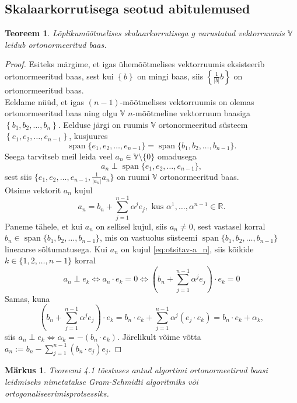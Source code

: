 \documentclass[a4paper,12pt]{article}
\newtheorem{teoreem}{Teoreem}[section]
\newtheorem{markus}{Märkus}[section]
\numberwithin{equation}{section}
\DeclareMathOperator{\spn}{span}
\begin{document}
\newpage
\begin{appendices}
\section{Skalaarkorrutisega seotud abitulemused}
\label{lisa:skalaar}

\begin{teoreem}
Lõplikumõõtmelises skalaarkorrutisega $g$ varustatud vektorruumis $\mathbb{V}$ leidub ortonormeeritud baas.
\end{teoreem}
\begin{proof}
Esiteks märgime, et igas ühemõõtmelises vektorruumis eksisteerib ortonormeeritud baas, sest kui $\left\lbrace b \right\rbrace$ on mingi baas, siis $\left\lbrace \frac{1}{|b|} b\right\rbrace$ on ortonormeeritud baas.\\
Eeldame nüüd, et igas $(n-1)$-mõõtmelises vektorruumis on olemas ortonormeeritud baas ning olgu $\mathbb{V}$ $n$-mõõtmeline vektorruum baasiga $\left\lbrace b_1, b_2, \dots, b_n \right\rbrace$. Eelduse järgi on ruumis $\mathbb{V}$ ortonormeeritud süsteem $\left\lbrace e_1, e_2, \dots, e_{n-1} \right\rbrace$, kusjuures
\[ \spn\{ e_1, e_2, \dots, e_{n-1}\} = \spn\{ b_1, b_2, \dots, b_{n-1}\}. \]
Seega tarvitseb meil leida veel $a_n \in \mathbb{V} \setminus \{0\}$ omadusega
\[a_n \perp \spn\{ e_1, e_2, \dots, e_{n-1}\},\]
sest siis $\{ e_1, e_2, \dots, e_{n-1}, \frac{1}{|a_n|}a_n\}$ on ruumi $\mathbb{V}$ ortonormeeritud baas.\\
Otsime vektorit $a_n$ kujul
\begin{equation} \label{eq:otsitav-a_n}
a_n = b_n + \sum_{j = 1}^{n-1} \alpha^j e_j, \text{ kus } \alpha^1, \dots, \alpha^{n-1} \in \mathbb{R}.
\end{equation}
Paneme tähele, et kui $a_n$ on sellisel kujul, siis $a_n \neq 0$, sest vastasel korral $b_n \in \spn\{ b_1, b_2, \dots, b_{n-1}\}$, mis on vastuolus süsteemi $\spn\{ b_1, b_2, \dots, b_{n-1}\}$ lineaarse sõltumatusega.
Kui $a_n$ on kujul \ref{eq:otsitav-a_n}, siis kõikide $k \in \{1, 2, \dots, n-1\}$ korral
\begin{equation*}
a_n \perp e_k \iff a_n \cdot e_k = 0 \iff \left(b_n + \sum_{j = 1}^{n-1} \alpha^j e_j\right) \cdot e_k = 0
\end{equation*}
Samas, kuna
\begin{equation*}
\left(b_n + \sum_{j = 1}^{n-1} \alpha^j e_j\right) \cdot e_k = b_n \cdot e_k + \sum_{j = 1}^{n-1} \alpha^j \left(e_j \cdot e_k \right) = b_n \cdot e_k + \alpha_k,
\end{equation*}
siis $a_n \perp e_k \iff \alpha_k = - \left(b_n \cdot e_k \right)$. \newline
Järelikult võime võtta $a_n := b_n - \sum_{j=1}^{n-1}\left(b_n \cdot e_j\right)e_j$.
\end{proof}
\begin{markus} \label{markus:gram-schmidt}
Teoreemi 4.1 tõestuses antud algortimi ortonormeetirud baasi leidmiseks nimetatakse \emph{Gram-Schmidti algoritmiks} või \emph{ortogonaliseerimisprotsessiks}.
\end{markus}


\end{appendices}
\end{document}
